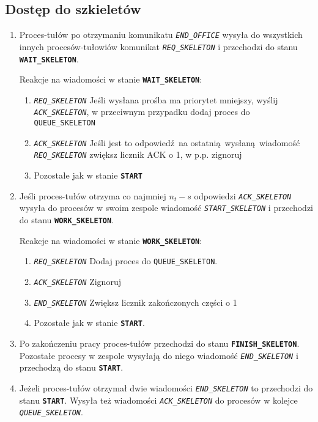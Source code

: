 \documentclass[12pt]{article}
\newcommand{\state}[1]{\texttt{\textbf{#1}}}
\newcommand{\msg}[1]{\texttt{\emph{#1}}}
\newcommand{\var}[1]{\texttt{#1}}
\begin{document}
\subsection{Dostęp do szkieletów}
\begin{enumerate}
	\item Proces-tułów po otrzymaniu komunikatu \msg{END\_OFFICE} wysyła do wszystkich innych procesów-tułowiów komunikat \msg{REQ\_SKELETON} i przechodzi do stanu \state{WAIT\_SKELETON}.
	
	Reakcje na wiadomości w stanie \state{WAIT\_SKELETON}:
	\begin{enumerate}
		\item \msg{REQ\_SKELETON} Jeśli wysłana prośba ma priorytet mniejszy, wyślij \msg{ACK\_SKELETON}, w przeciwnym przypadku dodaj proces do \var{QUEUE\_SKELETON}
		\item \msg{ACK\_SKELETON} Jeśli jest to odpowiedź na ostatnią wysłaną wiadomość \msg{REQ\_SKELETON} zwiększ licznik ACK o 1, w p.p. zignoruj
		\item  Pozostałe jak w stanie \state{START}
	\end{enumerate}
	
	\item Jeśli proces-tułów otrzyma co najmniej $n_t - s$ odpowiedzi \msg{ACK\_SKELETON} wysyła do procesów w swoim zespole wiadomość \msg{START\_SKELETON} i przechodzi do stanu \state{WORK\_SKELETON}.
	
	Reakcje na wiadomości w stanie \state{WORK\_SKELETON}:
	\begin{enumerate}
		\item \msg{REQ\_SKELETON} Dodaj proces do \var{QUEUE\_SKELETON}.
		\item \msg{ACK\_SKELETON} Zignoruj
		\item \msg{END\_SKELETON} Zwiększ licznik zakończonych części o 1
		\item  Pozostałe jak w stanie \state{START}.
	\end{enumerate}
	
	\item Po zakończeniu pracy proces-tułów przechodzi do stanu \state{FINISH\_SKELETON}. Pozostałe procesy w zespole wysyłają do niego wiadomość \msg{END\_SKELETON} i przechodzą do stanu \state{START}.
	
	\item Jeżeli proces-tułów otrzymał dwie wiadomości \msg{END\_SKELETON} to  przechodzi do stanu \state{START}.
 	Wysyła też wiadomości \msg{ACK\_SKELETON} do procesów w kolejce \msg{QUEUE\_SKELETON}.
\end{enumerate}
\end{document}
